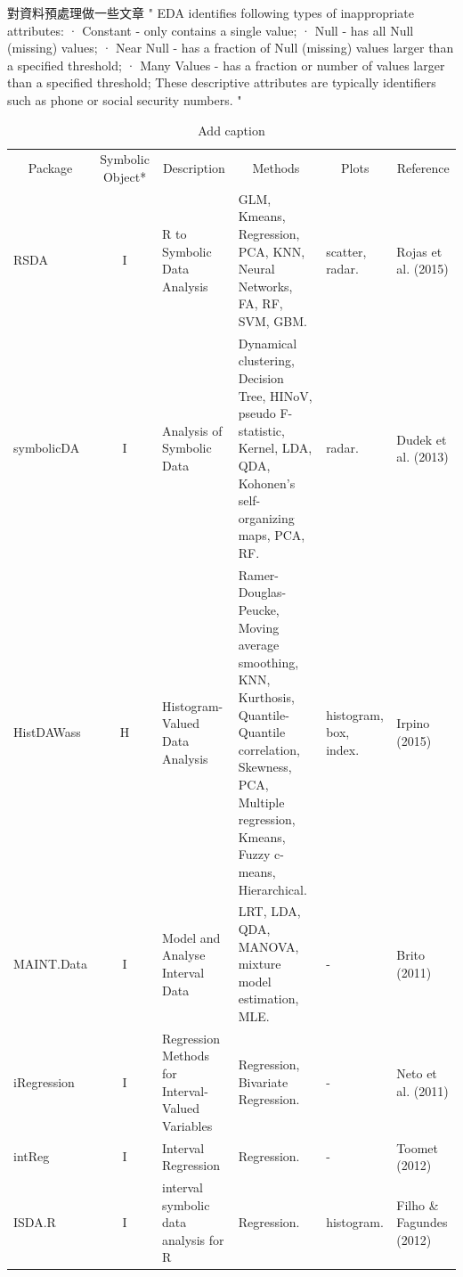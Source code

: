 \documentclass[article]{jss}
\begin{document}
對資料預處理做一些文章
"
EDA identifies
following types of inappropriate attributes:
· Constant - only contains a single value;
· Null - has all Null (missing) values;
· Near Null - has a fraction of Null (missing) values
larger than a specified threshold;
· Many Values - has a fraction or number of values larger
than a specified threshold; These descriptive attributes
are typically identifiers such as phone or social security
numbers.
"



 



\begin{table}[htbp]
  \centering
  \caption{Add caption}
    \begin{tabular}{|l|c|p{13.19em}|p{21em}|p{16.5em}|l|}
    \hline
    \multicolumn{1}{|c|}{\multirow{2}[2]{*}{Package}} & \multicolumn{1}{c|}{\multirow{2}[2]{*}{Symbolic Object*}} & \multicolumn{1}{c|}{\multirow{2}[2]{*}{Description}} & \multicolumn{1}{c|}{\multirow{2}[2]{*}{Methods}} & \multicolumn{1}{c|}{\multirow{2}[2]{*}{Plots}} & \multicolumn{1}{c|}{\multirow{2}[2]{*}{Reference}} \\
          &       & \multicolumn{1}{c|}{} & \multicolumn{1}{c|}{} & \multicolumn{1}{c|}{} &  \\
    \hline
    RSDA  & I     & R to Symbolic Data Analysis & GLM, Kmeans, Regression, PCA, KNN, Neural Networks, FA, RF, SVM, GBM. & scatter, radar. & Rojas et al. (2015) \\
    symbolicDA & I     & Analysis of Symbolic Data & Dynamical clustering, Decision Tree, HINoV,  pseudo F-statistic, Kernel, LDA, QDA, Kohonen's self-organizing maps, PCA, RF. & radar. & Dudek et al. (2013) \\
    HistDAWass & H     & Histogram-Valued Data Analysis & Ramer-Douglas-Peucke, Moving average smoothing, KNN, Kurthosis, Quantile-Quantile correlation, Skewness, PCA, Multiple regression, Kmeans, Fuzzy c-means, Hierarchical. & histogram, box, index. & Irpino (2015) \\
    MAINT.Data & I     & Model and Analyse Interval Data & LRT, LDA, QDA, MANOVA, mixture model estimation, MLE. & -     & Brito (2011) \\
    iRegression & I     & Regression Methods for Interval-Valued Variables & Regression, Bivariate Regression. & -     & Neto et al. (2011) \\
    intReg & I     & Interval Regression & Regression. & -     & Toomet (2012) \\
    ISDA.R & I     & interval symbolic data analysis for R & Regression. & histogram. & Filho \&  Fagundes (2012) \\

\end{tabular}
\end{table}
\end{document}
